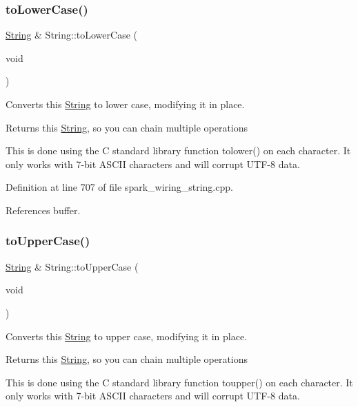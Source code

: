 \subsubsection{\texorpdfstring{to\+Lower\+Case()}{toLowerCase()}}
{\footnotesize\ttfamily \hyperlink{class_string}{String} \& String\+::to\+Lower\+Case (\begin{DoxyParamCaption}\item[{void}]{ }\end{DoxyParamCaption})}



Converts this \hyperlink{class_string}{String} to lower case, modifying it in place. 

\begin{DoxyReturn}{Returns}
this \hyperlink{class_string}{String}, so you can chain multiple operations
\end{DoxyReturn}
This is done using the C standard library function tolower() on each character. It only works with 7-\/bit A\+S\+C\+II characters and will corrupt U\+T\+F-\/8 data. 

Definition at line 707 of file spark\+\_\+wiring\+\_\+string.\+cpp.



References buffer.

\mbox{\label{class_string_a5384fd869d047a68429cbcc6d26d94fa}} 
\subsubsection{\texorpdfstring{to\+Upper\+Case()}{toUpperCase()}}
{\footnotesize\ttfamily \hyperlink{class_string}{String} \& String\+::to\+Upper\+Case (\begin{DoxyParamCaption}\item[{void}]{ }\end{DoxyParamCaption})}



Converts this \hyperlink{class_string}{String} to upper case, modifying it in place. 

\begin{DoxyReturn}{Returns}
this \hyperlink{class_string}{String}, so you can chain multiple operations
\end{DoxyReturn}
This is done using the C standard library function toupper() on each character. It only works with 7-\/bit A\+S\+C\+II characters and will corrupt U\+T\+F-\/8 data. 

